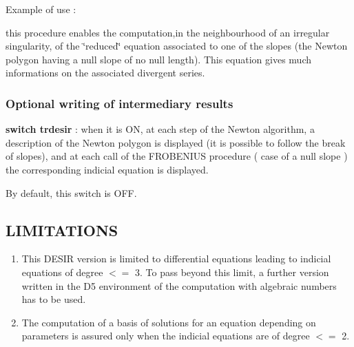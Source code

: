 Example of use :

this procedure enables the computation,in the neighbourhood of an irregular
singularity, of the \char`\"{}reduced\char`\"{} equation associated to one
of the slopes (the Newton polygon having a null slope of no null length). 
This equation gives much informations on the associated divergent series.

\subsubsection{Optional writing of intermediary results}

\textbf{switch trdesir} : when it is ON, at each step of the Newton algorithm, a
description of the Newton polygon is displayed (it is possible to follow
the break of slopes), and at each call of the FROBENIUS procedure ( case of
a null slope ) the corresponding indicial equation is displayed. \par

By default, this switch is OFF.

\subsection{LIMITATIONS}

\begin{enumerate}
\item This DESIR version is limited to differential equations leading
to indicial equations of degree $<=$ 3. To pass beyond this limit, a further
version written in the D5 environment of the computation with algebraic
numbers has to be used.
\item The computation of a basis of solutions for an equation depending on
parameters is assured only when the indicial equations are of degree $<=$ 2.
\end{enumerate}








